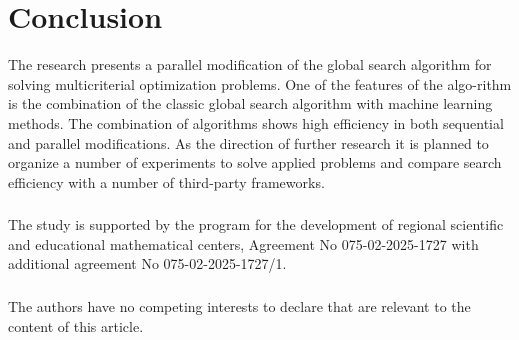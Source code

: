 \documentclass[runningheads]{llncs}
\begin{document}
\section{Conclusion}
\label{sec5}
The research presents a parallel modification of the global search algorithm for solving multicriterial optimization problems. One of the features of the algo-rithm is the combination of the classic global search algorithm with machine learning methods. The combination of algorithms shows high efficiency in both sequential and parallel modifications. As the direction of further research it is planned to organize a number of experiments to solve applied problems and compare search efficiency with a number of third-party frameworks.


\begin{credits}
\subsubsection{\ackname} The study  is supported by the program for the development of regional scientific and educational mathematical centers, Agreement No 075-02-2025-1727 with additional agreement No 075-02-2025-1727/1.

\subsubsection{\discintname}
The authors have no competing interests to declare that are relevant to the content of this article.
\end{credits}
%
%
%


%
%
%
%
%
\end{document}
